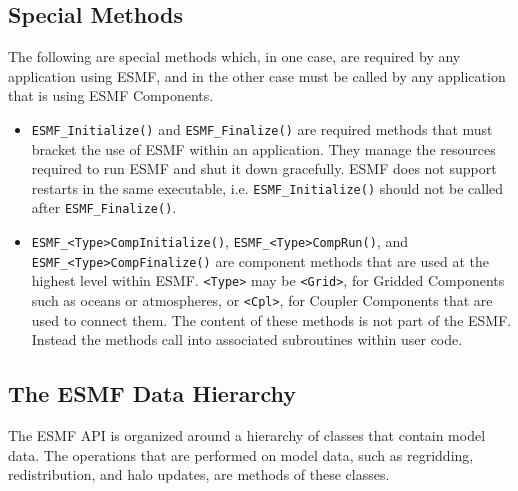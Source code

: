 

\subsection{Special Methods}

The following are special methods which, in one case,
are required by any application using ESMF, and in the 
other case must be called by any application that is using 
ESMF Components.

\begin{itemize}

\item {\tt ESMF\_Initialize()} and {\tt ESMF\_Finalize()} are required 
methods that must bracket the use of ESMF within an application.  
They manage the resources required to run ESMF and shut it down
gracefully.  ESMF does not support restarts in the same executable, i.e.
{\tt ESMF\_Initialize()} should not be called after {\tt ESMF\_Finalize()}.
\item {\tt ESMF\_<Type>CompInitialize()}, {\tt ESMF\_<Type>CompRun()}, and {\tt ESMF\_<Type>CompFinalize()} are component methods that are used at the 
highest level within ESMF.  {\tt <Type>} may be {\tt <Grid>}, for 
Gridded Components such as oceans or atmospheres, or
{\tt <Cpl>}, for Coupler Components that are used to connect 
them.  The content of these methods is not part of the ESMF.  
Instead the methods call into associated subroutines within 
user code.

\end{itemize}

\subsection{The ESMF Data Hierarchy}

The ESMF API is organized around a hierarchy of classes that
contain model data.  The operations that are performed
on model data, such as regridding, redistribution, and halo 
updates, are methods of these classes.  

